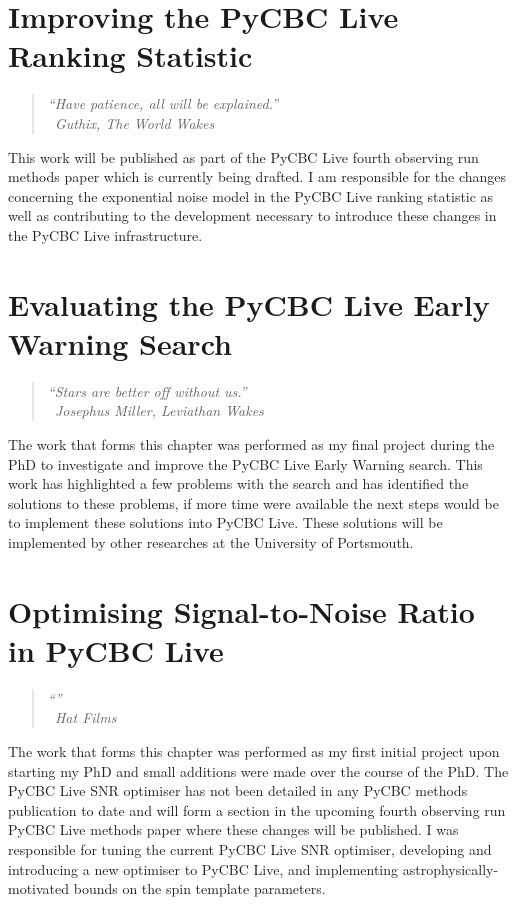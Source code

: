 \documentclass[12pt,twoside]{report} %
\makeatletter
\newcommand{\chapterquote}[2]{
  \begin{quote}
    \color{darkgray}\itshape #1 \\[1ex] %
    \raggedleft %
    \textemdash\ #2
  \end{quote}
}
\renewcommand{\cleardoublepage}{%
  \clearpage%
  \if@twoside
    \ifodd\c@page
    \else
      \hbox{}%
      \thispagestyle{empty}%
      \newpage
    \fi
  \fi
}
\let\oldchapter\chapter
\renewcommand{\chapter}{\cleardoublepage\oldchapter}
\makeatother
\begin{document}
\chapter[Improving the PyCBC Live Ranking Statistic]{\label{chapter:5-pycbc-live}Improving the PyCBC Live Ranking Statistic}
\chapterquote{``Have patience, all will be explained.''}{Guthix, The World Wakes}
This work will be published as part of the PyCBC Live fourth observing run methods paper which is currently being drafted. I am responsible for the changes concerning the exponential noise model in the PyCBC Live ranking statistic as well as contributing to the development necessary to introduce these changes in the PyCBC Live infrastructure.


\chapter[Evaluating the PyCBC Live Early Warning Search]{\label{chapter:6-earlywarning}Evaluating the PyCBC Live Early Warning Search}
\chapterquote{``Stars are better off without us.''}{Josephus Miller, Leviathan Wakes}
The work that forms this chapter was performed as my final project during the PhD to investigate and improve the PyCBC Live Early Warning search. This work has highlighted a few problems with the search and has identified the solutions to these problems, if more time were available the next steps would be to implement these solutions into PyCBC Live. These solutions will be implemented by other researches at the University of Portsmouth.


\chapter[Optimising Signal-to-Noise Ratio in PyCBC Live]{\label{chapter:7-snr-optimiser}Optimising Signal-to-Noise Ratio in PyCBC Live}
\chapterquote{``''}{Hat Films}
The work that forms this chapter was performed as my first initial project upon starting my PhD and small additions were made over the course of the PhD. The PyCBC Live SNR optimiser has not been detailed in any PyCBC methods publication to date and will form a section in the upcoming fourth observing run PyCBC Live methods paper where these changes will be published. I was responsible for tuning the current PyCBC Live SNR optimiser, developing and introducing a new optimiser to PyCBC Live, and implementing astrophysically-motivated bounds on the spin template parameters.

\end{document}
